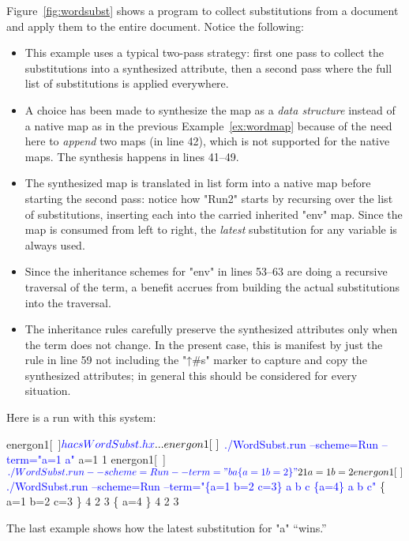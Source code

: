 \documentclass[11pt]{article} %
\begin{document}
\begin{example}
  Figure~\ref{fig:wordsubst} shows a \HAX program to collect substitutions from a document and apply
  them to the entire document.  Notice the following:
  \begin{itemize}

  \item This example uses a typical two-pass strategy: first one pass to collect the substitutions
    into a synthesized attribute, then a second pass where the full list of substitutions is applied
    everywhere.

  \item A choice has been made to synthesize the map as a \emph{data structure} instead of a native
    \HAX map as in the previous Example~\ref{ex:wordmap} because of the need here to \emph{append}
    two maps (in line 42), which is not supported for the native maps.  The synthesis happens in
    lines 41--49.

  \item The synthesized map is translated in list form into a native \HAX map before starting the
    second pass: notice how "Run2" starts by recursing over the list of substitutions, inserting
    each into the carried inherited "env" map.  Since the map is consumed from left to right, the
    \emph{latest} substitution for any variable is always used.

  \item Since the inheritance schemes for "env" in lines 53--63 are doing a recursive traversal of
    the term, a benefit accrues from building the actual substitutions into the traversal.

  \item The inheritance rules carefully preserve the synthesized attributes only when the term does
    not change. In the present case, this is manifest by just the rule in line 59 not including the
    "↑#s" marker to capture and copy the synthesized attributes; in general this should be
    considered for every situation.

  \end{itemize}
  Here is a run with this system:
\begin{code}[commandchars=\\\{\}]
energon1[~]$ \textcolor{blue}{hacs WordSubst.hx}
...
energon1[~]$ \textcolor{blue}{./WordSubst.run --scheme=Run --term="a=1 a"}
 a=1  1   
energon1[~]$ \textcolor{blue}{./WordSubst.run --scheme=Run --term="b a \{a=1 b=2\}"}
 2  1   {  a=1  b=2    }     
energon1[~]$ \textcolor{blue}{./WordSubst.run --scheme=Run --term="\{a=1 b=2 c=3\} a b c \{a=4\} a b c"}
  \{  a=1  b=2  c=3     \}   4  2  3   \{  a=4   \}   4  2  3         
\end{code}
  The last example shows how the latest substitution for "a" ``wins.''
\end{example}
\end{document}
